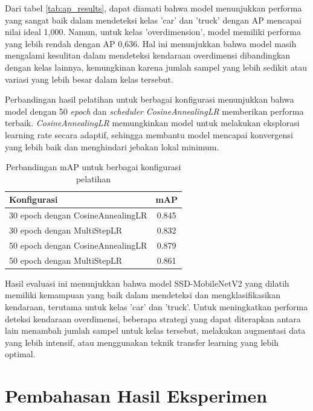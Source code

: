 Dari tabel \ref{tab:ap_results}, dapat diamati bahwa model menunjukkan performa yang sangat baik dalam mendeteksi kelas 'car' dan 'truck' dengan AP mencapai nilai ideal 1,000. Namun, untuk kelas 'overdimension', model memiliki performa yang lebih rendah dengan AP 0,636. Hal ini menunjukkan bahwa model masih mengalami kesulitan dalam mendeteksi kendaraan overdimensi dibandingkan dengan kelas lainnya, kemungkinan karena jumlah sampel yang lebih sedikit atau variasi yang lebih besar dalam kelas tersebut.

Perbandingan hasil pelatihan untuk berbagai konfigurasi menunjukkan bahwa model dengan 50 \emph{epoch} dan \emph{scheduler} \emph{CosineAnnealingLR} memberikan performa terbaik. \emph{CosineAnnealingLR} memungkinkan model untuk melakukan eksplorasi learning rate secara adaptif, sehingga membantu model mencapai konvergensi yang lebih baik dan menghindari jebakan lokal minimum.

\begin{table}[htbp]
  \centering
  \begin{tabular}{|l|c|}
    \hline
    \rowcolor[HTML]{C0C0C0}
    \textbf{Konfigurasi} & \textbf{mAP} \\
    \hline
    30 epoch dengan CosineAnnealingLR & 0.845 \\
    \hline
    30 epoch dengan MultiStepLR & 0.832 \\
    \hline
    50 epoch dengan CosineAnnealingLR & 0.879 \\
    \hline
    50 epoch dengan MultiStepLR & 0.861 \\
    \hline
  \end{tabular}
  \caption{Perbandingan mAP untuk berbagai konfigurasi pelatihan}
  \label{fig:map_comparison}
\end{table}

Hasil evaluasi ini menunjukkan bahwa model SSD-MobileNetV2 yang dilatih memiliki kemampuan yang baik dalam mendeteksi dan mengklasifikasikan kendaraan, terutama untuk kelas 'car' dan 'truck'. Untuk meningkatkan performa deteksi kendaraan overdimensi, beberapa strategi yang dapat diterapkan antara lain menambah jumlah sampel untuk kelas tersebut, melakukan augmentasi data yang lebih intensif, atau menggunakan teknik transfer learning yang lebih optimal.

\section{Pembahasan Hasil Eksperimen}
\label{sec:pembahasanhasileksperimen}

